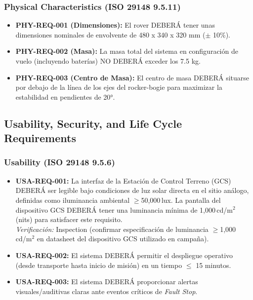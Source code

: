 \subsubsection{Physical Characteristics (ISO 29148 9.5.11)}
\begin{itemize}
    \item \textbf{PHY-REQ-001 (Dimensiones):} El rover DEBERÁ tener unas dimensiones nominales de envolvente de 480 x 340 x 320 mm ($\pm$ 10\%).
    \item \textbf{PHY-REQ-002 (Masa):} La masa total del sistema en configuración de vuelo (incluyendo baterías) NO DEBERÁ exceder los 7.5 kg.
    \item \textbf{PHY-REQ-003 (Centro de Masa):} El centro de masa DEBERÁ situarse por debajo de la línea de los ejes del rocker-bogie para maximizar la estabilidad en pendientes de 20°.
\end{itemize}

\subsection{Usability, Security, and Life Cycle Requirements}

\subsubsection{Usability (ISO 29148 9.5.6)}
\begin{itemize}
    \item \textbf{USA-REQ-001:} La interfaz de la Estación de Control Terreno (GCS) DEBERÁ ser legible bajo condiciones de luz solar directa en el sitio análogo, definidas como iluminancia ambiental $\ge$50{,}000\,lux. La pantalla del dispositivo GCS DEBERÁ tener una luminancia mínima de 1{,}000\,cd/m$^2$ (nits) para satisfacer este requisito. \cite{display_brightness_outdoor} \\
    \textit{Verificación:} Inspection (confirmar especificación de luminancia $\ge$1{,}000\,cd/m$^2$ en datasheet del dispositivo GCS utilizado en campaña).
    \item \textbf{USA-REQ-002:} El sistema DEBERÁ permitir el despliegue operativo (desde transporte hasta inicio de misión) en un tiempo $\le$ 15 minutos.
    \item \textbf{USA-REQ-003:} El sistema DEBERÁ proporcionar alertas visuales/auditivas claras ante eventos críticos de \emph{Fault Stop}.
\end{itemize}

